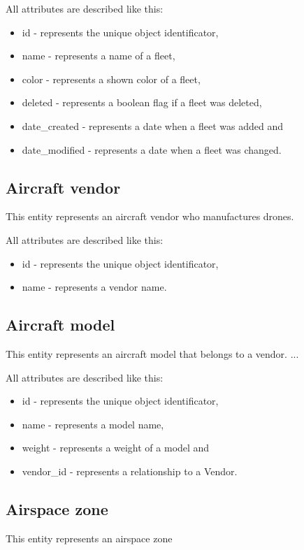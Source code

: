 All attributes are described like this:
\begin{itemize}
    \item id - represents the unique object identificator,
    \item name - represents a name of a fleet,
    \item color - represents a shown color of a fleet,
    \item deleted - represents a boolean flag if a fleet was deleted,
    \item date\_created - represents a date when a fleet was added and
    \item date\_modified - represents a date when a fleet was changed.
\end{itemize}

\subsection{Aircraft vendor}\label{subsec:aircraft-vendor}
This entity represents an aircraft vendor who manufactures drones.

All attributes are described like this:
\begin{itemize}
    \item id - represents the unique object identificator,
    \item name - represents a vendor name.
\end{itemize}

\subsection{Aircraft model}\label{subsec:aircraft-model}
This entity represents an aircraft model that belongs to a vendor.
... %

All attributes are described like this:
\begin{itemize}
    \item id - represents the unique object identificator,
    \item name - represents a model name,
    \item weight - represents a weight of a model and
    \item vendor\_id - represents a relationship to a Vendor.
\end{itemize}

\subsection{Airspace zone}\label{subsec:airspace-zone}
This entity represents an airspace zone

